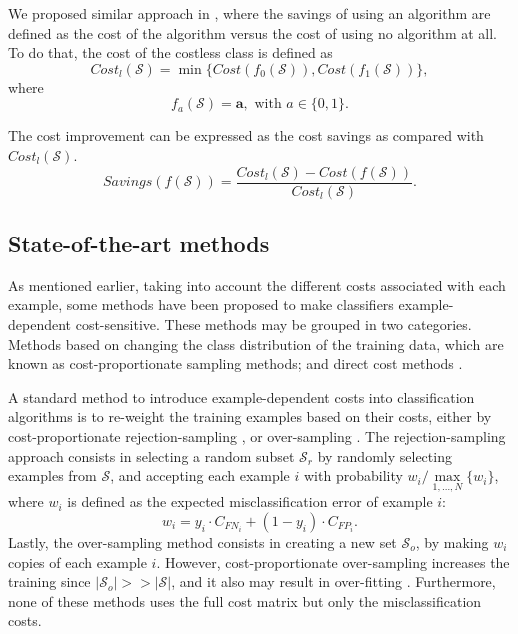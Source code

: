 {  We proposed similar approach in \citep{CorreaBahnsen2014b}, where the savings of using an 
  algorithm  are defined as the cost of the algorithm versus the cost of using no algorithm at all. 
  To do that, the cost of the costless class is defined as 
  \begin{equation}
    Cost_l(\mathcal{S}) = \min \{Cost(f_0(\mathcal{S})), Cost(f_1(\mathcal{S}))\},
  \end{equation}
  where 
  \begin{equation}\label{eq:3:f_a}
    f_a(\mathcal{S}) = \mathbf{a}, \text{ with } a\in \{0,1\}.
  \end{equation}

  The cost improvement can be expressed as the cost savings as compared with $Cost_l(\mathcal{S})$. 
  \begin{equation}\label{eq:3:savings}
    Savings(f(\mathcal{S})) = \frac{ Cost_l(\mathcal{S}) - Cost(f(\mathcal{S}))}
    {Cost_l(\mathcal{S})}.
  \end{equation} 


\subsection{State-of-the-art methods}

  As mentioned earlier, taking into account the different costs associated with each example, 
  some methods have been proposed to make classifiers example-dependent cost-sensitive. These 
  methods may be grouped in two categories. Methods based on changing the class distribution of 
  the training data, which are known as cost-proportionate sampling methods; and direct cost 
  methods \citep{Wang2013}.

  A standard method to introduce example-dependent costs into classification algorithms is to 
  re-weight the training examples based on their costs, either by cost-proportionate 
  rejection-sampling \citep{Zadrozny2003}, or over-sampling \citep{Elkan2001}. The 
  rejection-sampling approach consists in selecting a random subset $\mathcal{S}_{r}$  by 
  randomly  selecting examples from $\mathcal{S}$, and accepting each example $i$ with 
  probability $w_i/ \max\limits_{1,\dots, N}\{w_i\}$, where $w_i$ is defined as the expected 
  misclassification error of example $i$:
  \begin{equation}\label{eq_pred1}
    w_i = y_i\cdot C_{FN_i}+(1-y_i)\cdot C_{FP_i}.
  \end{equation}
  Lastly, the over-sampling method consists in creating a new set $\mathcal{S}_{o}$, by making 
  $w_i$ copies of each example $i$. However, cost-proportionate over-sampling increases the 
  training  since $\vert \mathcal{S}_{o}\vert >> \vert \mathcal{S} \vert$, and it also may result 
  in over-fitting  \citep{Drummond2003}. Furthermore, none of these methods uses the full cost 
  matrix but only the  misclassification costs.

}
